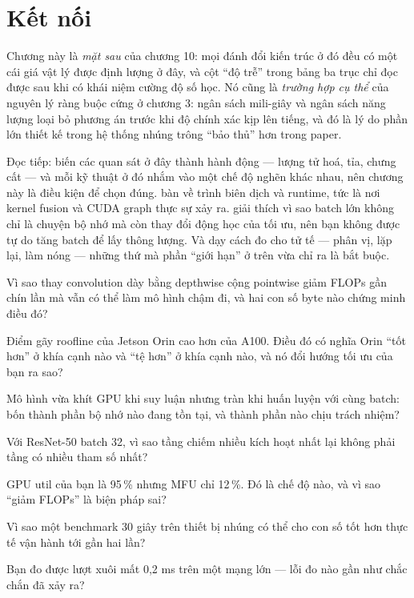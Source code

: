 \documentclass[../../deep_learning.tex]{subfiles}
\begin{document}
\section{Kết nối}

Chương này là \emph{mặt sau} của chương 10: mọi đánh đổi kiến trúc ở đó đều có một cái giá vật lý được định lượng ở đây, và cột ``độ trễ'' trong bảng ba trục chỉ đọc được sau khi có khái niệm cường độ số học. Nó cũng là \emph{trường hợp cụ thể} của nguyên lý ràng buộc cứng ở chương 3: ngân sách mili-giây và ngân sách năng lượng loại bỏ phương án trước khi độ chính xác kịp lên tiếng, và đó là lý do phần lớn thiết kế trong hệ thống nhúng trông ``bảo thủ'' hơn trong paper.

Đọc tiếp:  biến các quan sát ở đây thành hành động --- lượng tử hoá, tỉa, chưng cất --- và mỗi kỹ thuật ở đó nhắm vào một chế độ nghẽn khác nhau, nên chương này là điều kiện để chọn đúng.  bàn về trình biên dịch và runtime, tức là nơi kernel fusion và CUDA graph thực sự xảy ra.  giải thích vì sao batch lớn không chỉ là chuyện bộ nhớ mà còn thay đổi động học của tối ưu, nên bạn không được tự do tăng batch để lấy thông lượng. Và  dạy cách đo cho tử tế --- phân vị, lặp lại, làm nóng --- những thứ mà phần ``giới hạn'' ở trên vừa chỉ ra là bắt buộc.

\begin{tukiem}
\item Vì sao thay convolution dày bằng depthwise cộng pointwise giảm FLOPs gần chín lần mà vẫn có thể làm mô hình chậm đi, và hai con số byte nào chứng minh điều đó?
\item Điểm gãy roofline của Jetson Orin cao hơn của A100. Điều đó có nghĩa Orin ``tốt hơn'' ở khía cạnh nào và ``tệ hơn'' ở khía cạnh nào, và nó đổi hướng tối ưu của bạn ra sao?
\item Mô hình vừa khít GPU khi suy luận nhưng tràn khi huấn luyện với cùng batch: bốn thành phần bộ nhớ nào đang tồn tại, và thành phần nào chịu trách nhiệm?
\item Với ResNet-50 batch 32, vì sao tầng chiếm nhiều kích hoạt nhất lại không phải tầng có nhiều tham số nhất?
\item GPU util của bạn là 95\,\% nhưng MFU chỉ 12\,\%. Đó là chế độ nào, và vì sao ``giảm FLOPs'' là biện pháp sai?
\item Vì sao một benchmark 30 giây trên thiết bị nhúng có thể cho con số tốt hơn thực tế vận hành tới gần hai lần?
\item Bạn đo được lượt xuôi mất 0,2 ms trên một mạng lớn --- lỗi đo nào gần như chắc chắn đã xảy ra?
\end{tukiem}

\ifSubfilesClassLoaded{\printbibliography[title={Nguồn}]}{}
\end{document}
